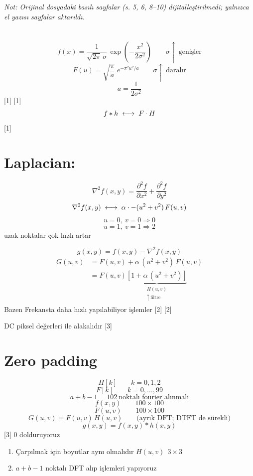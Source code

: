 \documentclass[11pt,a4paper]{article}
\begin{document}
\textit{Not: Orijinal dosyadaki basılı sayfalar (s. 5, 6, 8--10) dijitalleştirilmedi; yalnızca el yazısı sayfalar aktarıldı.}

\section{}
\[
f(x)=\frac{1}{\sqrt{2\pi}\,\sigma}\,\exp\!\left(-\frac{x^{2}}{2\sigma^{2}}\right)
\qquad \sigma{\uparrow}\ \text{genişler}
\]
\[
F(u)=\sqrt{\frac{\pi}{a}}\;e^{-\pi^{2}u^{2}/a}
\qquad \sigma{\uparrow}\ \text{daralır}
\]
\[
a=\frac{1}{2\sigma^{2}}
\]
[1]
[1]
\[ f * h \;\longleftrightarrow\; F\cdot H \]
[1]

\section{Laplacian:}
\[
\nabla^{2}f(x,y)=\frac{\partial^{2}f}{\partial x^{2}}+\frac{\partial^{2}f}{\partial y^{2}}
\]
\[
\nabla^{2}f(x,y)\;\longleftrightarrow\; \alpha\cdot-(u^{2}+v^{2})\,F(u,v)
\]
\[ u=0,\ v=0 \Rightarrow 0 \]
\[ u=1,\ v=1 \Rightarrow 2 \]
uzak noktalar çok hızlı artar

\[ g(x,y)=f(x,y)-\nabla^{2}f(x,y) \]
\begin{align*}
G(u,v) &= F(u,v)+\alpha\,(u^{2}+v^{2})\,F(u,v)\\
&= F(u,v)\underbrace{\left[1+\alpha\,(u^{2}+v^{2})\right]}_{\substack{H(u,v)\\ \uparrow\ \text{filtre}}}
\end{align*}
Bazen Frekansta daha hızlı yapılabiliyor işlemler
[2]
[2]

DC piksel değerleri ile alakalıdır
[3]

\section{Zero padding}
\[ H[k]\qquad k=0,1,2 \]
\[ F[k]\qquad k=0,\ldots,99 \]
\[ a+b-1=102\ \text{noktalı fourier alınmalı} \]
\[ f(x,y)\qquad 100\times100 \]
\[ F(u,v)\qquad 100\times100 \]
\[ G(u,v)=F(u,v)\,H(u,v)\qquad \text{(ayrık DFT;\ DTFT de sürekli)} \]
\[ g(x,y)=f(x,y)*h(x,y) \]
[3]
 0 dolduruyoruz
\begin{enumerate}[label=\arabic*-]
\item Çarpılmak için boyutlar aynı olmalıdır \quad $H(u,v)\ \ 3\times3$
\item $a+b-1$ noktalı DFT alıp işlemleri yapıyoruz
\end{enumerate}
\end{document}
